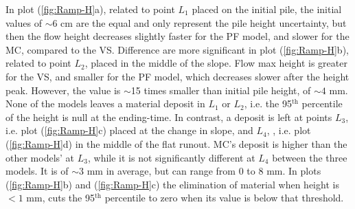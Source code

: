 \documentclass{article}
\begin{document}
In plot (\ref{fig:Ramp-H}a), related to point $L_1$ placed on the initial pile, the initial values of $\sim 6$ cm are the equal and only represent the pile height uncertainty, but then the flow height decreases slightly faster for the PF model, and slower for the MC, compared to the VS. Difference are more significant in plot (\ref{fig:Ramp-H}b), related to point $L_2$, placed in the middle of the slope. Flow max height is greater for the VS, and smaller for the PF model, which decreases slower after the height peak. However, the value is $\sim$15 times smaller than initial pile height, of $\sim 4$ mm. None of the models leaves a material deposit in $L_1$ or $L_2$, i.e. the 95$^{\mathrm{th}}$ percentile of the height is null at the ending-time. In contrast, a deposit is left at points $L_3$, i.e. plot (\ref{fig:Ramp-H}c) placed at the change in slope, and $L_4$, , i.e. plot (\ref{fig:Ramp-H}d) in the middle of the flat runout. MC's deposit is higher than the other models' at $L_3$, while it is not significantly different at $L_4$ between the three models. It is of $\sim 3$ mm in average, but can range from $0$ to $8$ mm. In plots (\ref{fig:Ramp-H}b) and (\ref{fig:Ramp-H}c) the elimination of material when height is $<1$ mm, cuts the 95$^{\mathrm{th}}$ percentile to zero when its value is below that threshold.
\end{document}
